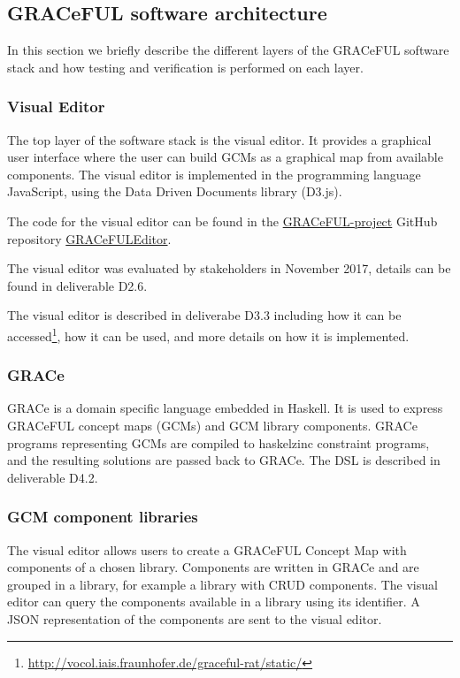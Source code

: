 \documentclass{article}
\begin{document}
\subsection{GRACeFUL software architecture}
In this section we briefly describe the different layers of
the GRACeFUL software stack and how testing and
verification is performed on each layer.

\subsubsection*{Visual Editor}

The top layer of the software stack is the visual editor.
%
It provides a graphical user interface where the user can build GCMs
as a graphical map from available components.
%
The visual editor is implemented in the programming language JavaScript, using
the Data Driven Documents library (D3.js).
%

The code for the visual editor can be found in the
\href{https://github.com/GRACeFUL-project}{GRACeFUL-project} GitHub
repository
\href{https://github.com/GRACeFUL-project/GRACeFULEditor}{GRACeFULEditor}.

The visual editor was evaluated by stakeholders in November 2017, details can be
found in deliverable D2.6. 

The visual editor is described in deliverabe D3.3 including how it can be
accessed\footnote{\url{http://vocol.iais.fraunhofer.de/graceful-rat/static/}},
how it can be used, and more details on how it is implemented.

\subsubsection*{GRACe}

GRACe is a domain specific language embedded in Haskell. It is used to express
GRACeFUL concept maps (GCMs) and GCM library components. GRACe programs
representing GCMs are compiled to haskelzinc constraint programs, and the
resulting solutions are passed back to GRACe. The DSL is described in deliverable
D4.2.

\subsubsection*{GCM component libraries}

The visual editor allows users to create a GRACeFUL Concept Map with components
of a chosen library. Components are written in GRACe and are grouped in a
library, for example a library with CRUD components. The visual editor can query
the components available in a library using its identifier. A JSON
representation of the components are sent to the visual editor.
\end{document}
